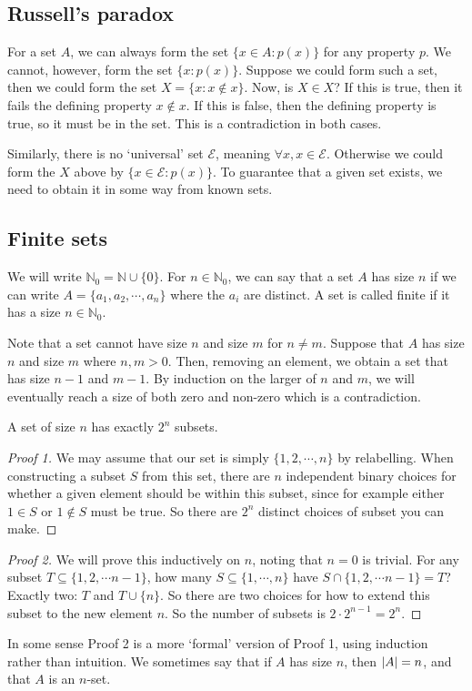 \subsection{Russell's paradox}
For a set \(A\), we can always form the set \(\{ x \in A: p(x) \}\) for any property \(p\).
We cannot, however, form the set \(\{ x: p(x) \}\).
Suppose we could form such a set, then we could form the set \(X = \{ x: x \notin x \}\).
Now, is \(X \in X\)?
If this is true, then it fails the defining property \(x \notin x\).
If this is false, then the defining property is true, so it must be in the set.
This is a contradiction in both cases.

Similarly, there is no `universal' set \(\mathscr E\), meaning \(\forall x, x \in \mathscr E\).
Otherwise we could form the \(X\) above by \(\{ x \in \mathscr E: p(x) \}\).
To guarantee that a given set exists, we need to obtain it in some way from known sets.

\subsection{Finite sets}
We will write \(\mathbb N_0 = \mathbb N \cup \{ 0 \}\).
For \(n \in \mathbb N_0\), we can say that a set \(A\) has size \(n\) if we can write \(A = \{ a_1, a_2, \cdots, a_n \}\) where the \(a_i\) are distinct.
A set is called finite if it has a size \(n \in \mathbb N_0\).

Note that a set cannot have size \(n\) and size \(m\) for \(n \neq m\).
Suppose that \(A\) has size \(n\) and size \(m\) where \(n, m > 0\).
Then, removing an element, we obtain a set that has size \(n-1\) and \(m-1\).
By induction on the larger of \(n\) and \(m\), we will eventually reach a size of both zero and non-zero which is a contradiction.

\begin{proposition}
	A set of size \(n\) has exactly \(2^n\) subsets.
\end{proposition}
\begin{proof}[Proof 1]
	We may assume that our set is simply \(\{ 1, 2, \cdots, n \}\) by relabelling.
	When constructing a subset \(S\) from this set, there are \(n\) independent binary choices for whether a given element should be within this subset, since for example either \(1 \in S\) or \(1 \notin S\) must be true.
	So there are \(2^n\) distinct choices of subset you can make.
\end{proof}
\begin{proof}[Proof 2]
	We will prove this inductively on \(n\), noting that \(n=0\) is trivial.
	For any subset \(T \subseteq \{ 1, 2, \cdots n-1 \}\), how many \(S \subseteq \{ 1, \cdots, n \}\) have \(S \cap \{ 1, 2, \cdots n-1 \} = T\)?
	Exactly two: \(T\) and \(T \cup \{ n \}\).
	So there are two choices for how to extend this subset to the new element \(n\).
	So the number of subsets is \(2 \cdot 2^{n-1} = 2^n\).
\end{proof}
\noindent In some sense Proof 2 is a more `formal' version of Proof 1, using induction rather than intuition.
We sometimes say that if \(A\) has size \(n\), then \(\abs{A} = n\), and that \(A\) is an \(n\)-set.
